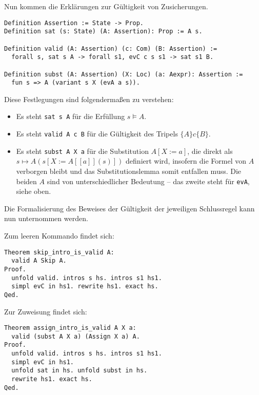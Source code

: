 \documentclass[8pt,fleqn,aspectratio=169]{beamer}
\newcommand{\parspace}{\vspace{0.8em}}
\newcommand{\code}[1]{{\texttt{#1}}}
\newcommand{\qb}[1]{[\!\![#1]\!\!]}
\begin{document}
\begin{frame}[fragile]
Nun kommen die Erklärungen zur Gültigkeit von Zusicherungen.

\begin{lstlisting}[language=Coq, xleftmargin=\mathindent]
Definition Assertion := State -> Prop.
Definition sat (s: State) (A: Assertion): Prop := A s.

Definition valid (A: Assertion) (c: Com) (B: Assertion) :=
  forall s, sat s A -> forall s1, evC c s s1 -> sat s1 B.

Definition subst (A: Assertion) (X: Loc) (a: Aexpr): Assertion :=
  fun s => A (variant s X (evA a s)).
\end{lstlisting}

Diese Festlegungen sind folgendermaßen zu verstehen:
\begin{itemize}
\item Es steht \code{sat s A} für die Erfüllung $s\models A$.
\item Es steht \code{valid A c B} für die Gültigkeit des Tripels $\{A\}c\{B\}$.
\item Es steht \code{subst A X a} für die Substitution $A[X:=a]$, die direkt
als $s\mapsto A(s[X:=A\qb{a}(s)])$ definiert wird, insofern die Formel
von $A$ verborgen bleibt und das Substitutionslemma somit entfallen muss.
{\footnotesize Die beiden $A$ sind von unterschiedlicher Bedeutung --
das zweite steht für \code{evA}, siehe oben.}
\end{itemize}
\end{frame}

\begin{frame}[fragile]
Die Formalisierung des Beweises der Gültigkeit der jeweiligen Schlussregel
kann nun unternommen werden.

\parspace
Zum leeren Kommando findet sich:

\begin{small}
\begin{lstlisting}[language=Coq, xleftmargin=\mathindent]
Theorem skip_intro_is_valid A:
  valid A Skip A.
Proof.
  unfold valid. intros s hs. intros s1 hs1.
  simpl evC in hs1. rewrite hs1. exact hs.
Qed.
\end{lstlisting}
\end{small}

Zur Zuweisung findet sich:

\begin{small}
\begin{lstlisting}[language=Coq, xleftmargin=\mathindent]
Theorem assign_intro_is_valid A X a:
  valid (subst A X a) (Assign X a) A.
Proof.
  unfold valid. intros s hs. intros s1 hs1.
  simpl evC in hs1.
  unfold sat in hs. unfold subst in hs.
  rewrite hs1. exact hs.
Qed.
\end{lstlisting}
\end{small}
\end{frame}
\end{document}
